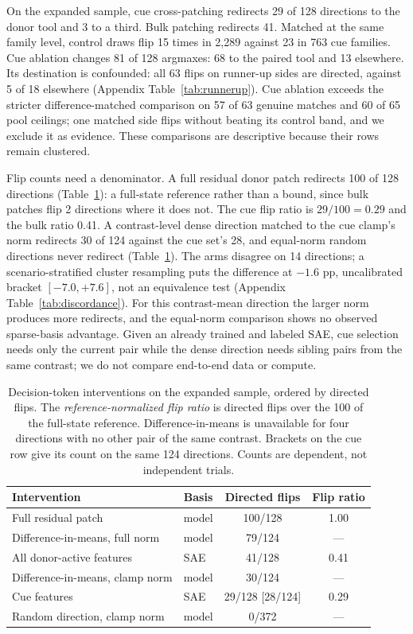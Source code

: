 \documentclass{article}
\begin{document}
On the expanded sample, cue cross-patching redirects 29 of 128 directions to
the donor tool and 3 to a third. Bulk
patching redirects 41. Matched at the same family level, control draws flip 15
times in 2,289 against 23 in 763 cue families. Cue ablation changes 81 of 128 argmaxes: 68 to the
paired tool and 13 elsewhere. Its destination is confounded: all 63 flips on
runner-up sides are directed, against 5 of 18 elsewhere (Appendix
Table~\ref{tab:runnerup}). Cue ablation exceeds the stricter
difference-matched comparison on 57 of 63 genuine matches and 60 of 65 pool
ceilings; one matched side flips without beating its control
band, and we exclude it as evidence. These comparisons are descriptive because
their rows remain clustered.

Flip counts need a denominator. A full residual donor patch redirects 100 of
128 directions (Table~\ref{tab:ceiling}): a full-state reference rather than a
bound, since bulk patches flip 2 directions where it does not. The cue flip
ratio is $29/100=0.29$ and the bulk ratio 0.41. A contrast-level dense
direction matched to the cue clamp's norm redirects 30 of 124 against the cue
set's 28, and equal-norm random directions never redirect
(Table~\ref{tab:ceiling}). The arms disagree on 14 directions; a
scenario-stratified cluster resampling puts the difference at $-1.6$ pp,
uncalibrated bracket $[-7.0,+7.6]$, not an equivalence test
(Appendix Table~\ref{tab:discordance}). For this contrast-mean direction the larger
norm produces more redirects, and the equal-norm comparison shows no observed
sparse-basis advantage. Given an already trained and labeled SAE, cue selection
needs only the current pair while the dense direction needs sibling pairs from
the same contrast; we do not compare end-to-end data or compute.

\begin{table}[t]
\caption{Decision-token interventions on the expanded sample, ordered by
directed flips. The \emph{reference-normalized flip ratio} is directed flips
over the 100 of the full-state reference.
Difference-in-means is unavailable for four directions with no other pair of
the same contrast. Brackets on the cue row give its count on the same 124
directions. Counts are dependent, not independent trials.}
\label{tab:ceiling}
\centering
\small
\setlength{\tabcolsep}{5pt}
\begin{tabular}{@{}llcc@{}}
\toprule
Intervention & Basis & Directed flips & Flip ratio \\
\midrule
Full residual patch              & model & 100/128 & 1.00 \\
Difference-in-means, full norm   & model & 79/124  & --- \\
All donor-active features        & SAE   & 41/128  & 0.41 \\
Difference-in-means, clamp norm  & model & 30/124  & --- \\
Cue features                     & SAE   & 29/128 [28/124] & 0.29 \\
Random direction, clamp norm     & model & 0/372   & --- \\
\bottomrule
\end{tabular}
\end{table}
\end{document}
